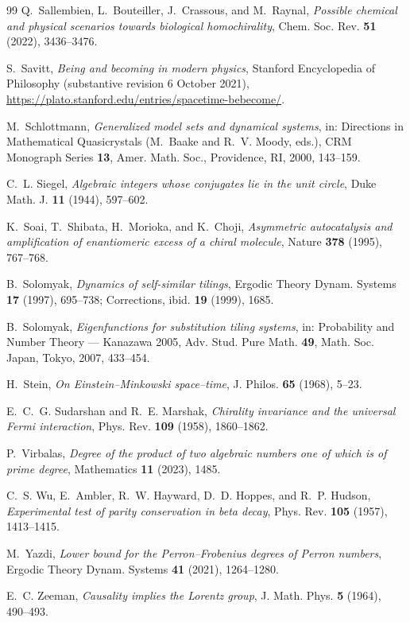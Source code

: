 \documentclass[11pt]{amsart}
\theoremstyle{plain}
\theoremstyle{definition}
\theoremstyle{remark}
\begin{document}
\begin{thebibliography}{99}
Q.~Sallembien, L.~Bouteiller, J.~Crassous, and M.~Raynal,
\emph{Possible chemical and physical scenarios towards biological homochirality},
Chem. Soc. Rev. \textbf{51} (2022), 3436--3476.

S.~Savitt,
\emph{Being and becoming in modern physics},
Stanford Encyclopedia of Philosophy (substantive revision 6 October 2021),
\url{https://plato.stanford.edu/entries/spacetime-bebecome/}.

M.~Schlottmann,
\emph{Generalized model sets and dynamical systems},
in: Directions in Mathematical Quasicrystals
(M.~Baake and R.~V. Moody, eds.),
CRM Monograph Series \textbf{13},
Amer. Math. Soc., Providence, RI, 2000, 143--159.

C.~L. Siegel,
\emph{Algebraic integers whose conjugates lie in the unit circle},
Duke Math. J. \textbf{11} (1944), 597--602.

K.~Soai, T.~Shibata, H.~Morioka, and K.~Choji,
\emph{Asymmetric autocatalysis and amplification of enantiomeric excess of a chiral molecule},
Nature \textbf{378} (1995), 767--768.

B.~Solomyak,
\emph{Dynamics of self-similar tilings},
Ergodic Theory Dynam. Systems \textbf{17} (1997), 695--738;
Corrections, ibid. \textbf{19} (1999), 1685.

B.~Solomyak,
\emph{Eigenfunctions for substitution tiling systems},
in: Probability and Number Theory --- Kanazawa 2005,
Adv. Stud. Pure Math. \textbf{49}, Math. Soc. Japan, Tokyo, 2007, 433--454.

H.~Stein,
\emph{On Einstein--Minkowski space--time},
J. Philos. \textbf{65} (1968), 5--23.

E.~C.~G. Sudarshan and R.~E. Marshak,
\emph{Chirality invariance and the universal Fermi interaction},
Phys. Rev. \textbf{109} (1958), 1860--1862.

P.~Virbalas,
\emph{Degree of the product of two algebraic numbers one of which is of prime degree},
Mathematics \textbf{11} (2023), 1485.

C.~S. Wu, E.~Ambler, R.~W. Hayward, D.~D. Hoppes, and R.~P. Hudson,
\emph{Experimental test of parity conservation in beta decay},
Phys. Rev. \textbf{105} (1957), 1413--1415.

M.~Yazdi,
\emph{Lower bound for the Perron--Frobenius degrees of Perron numbers},
Ergodic Theory Dynam. Systems \textbf{41} (2021), 1264--1280.

E.~C. Zeeman,
\emph{Causality implies the Lorentz group},
J. Math. Phys. \textbf{5} (1964), 490--493.

\end{thebibliography}
\end{document}
